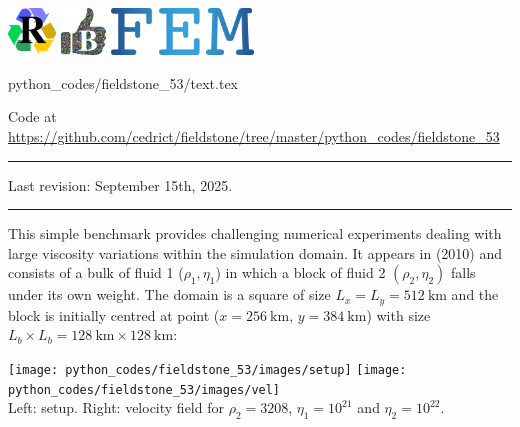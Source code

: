 \includegraphics[height=1.25cm]{images/pictograms/replication}
\includegraphics[height=1.25cm]{images/pictograms/benchmark}
\includegraphics[height=1.25cm]{images/pictograms/FEM}

\begin{flushright} {\tiny {\color{gray} python\_codes/fieldstone\_53/text.tex}} \end{flushright}

%

\begin{center}
Code at \url{https://github.com/cedrict/fieldstone/tree/master/python_codes/fieldstone_53}
\end{center}


\par\noindent\rule{\textwidth}{0.4pt}

Last revision: September 15th, 2025.

\par\noindent\rule{\textwidth}{0.4pt}



This simple benchmark provides challenging numerical experiments 
dealing with large viscosity variations within the simulation
domain. It appears in \textcite{gery10} (2010) and consists of a bulk of fluid 1 ($\rho_1,\eta_1$)
in which a block of fluid 2 $(\rho_2,\eta_2)$ falls under its own
weight. The domain is a square of size $L_x=L_y=512~\si{\km}$ and the
block is initially centred at point ($x=256~\si{\km}$, $y=384~\si{\km}$) with size
$L_b\times L_b = 128~\si{\km}\times 128~\si{\km}$:

\begin{center}
\texttt{[image: python\_codes/fieldstone\_53/images/setup]}
\texttt{[image: python\_codes/fieldstone\_53/images/vel]}\\
{\captionfont Left: setup. Right: velocity field for $\rho_2=3208$, $\eta_1=10^{21}$
and $\eta_2=10^{22}$.}
\end{center}


